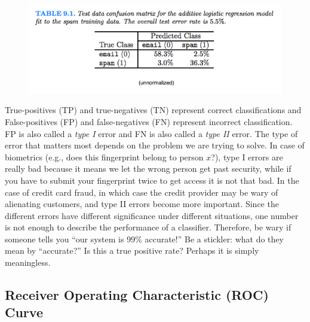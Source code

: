 \documentclass[a4paper]{article}
\begin{document}
\begin{figure}
\centering
\includegraphics[width=1.0\textwidth]{HTFtable9_1.png}
\label{spam}
\end{figure}

True-positives (TP) and true-negatives (TN) represent correct classifications and False-positives (FP) and false-negatives (FN) represent incorrect classification. FP is also called a \textit{type I} error and FN is also called a \textit{type II} error. The type of error that matters most depends on the problem we are trying to solve. In case of biometrics (e.g., does this fingerprint belong to person $x$?), type I errors are really bad because it means we let the wrong person get past security, while if you have to submit your fingerprint twice to get access it is not that bad. In the case of credit card fraud, in which case the credit provider may be wary of alienating customers, and type II errors become more important. Since the different errors have different significance under different situations, one number is not enough to describe the performance of a classifier. Therefore, be wary if someone tells you ``our system is 99\% accurate!''  Be a stickler: what do they mean by ``accurate?''  Is this a true positive rate?  Perhaps it is simply meaningless.

\subsection{Receiver Operating Characteristic (ROC) Curve}
\end{document}
